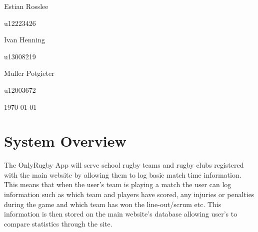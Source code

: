 \documentclass[hidelinks,a4paper,12pt]{article}
\begin{document}
\begin{titlepage}
\begin{center}
\begin{minipage}{0.4\textwidth}
\begin{flushleft} \large
Estian {Rosslee}
\end{flushleft}
\end{minipage}
\begin{minipage}{0.4\textwidth}
\begin{flushright} \large
\emph{}
u12223426
\end{flushright}
\end{minipage}

\begin{minipage}{0.4\textwidth}
\begin{flushleft} \large
Ivan {Henning}
\end{flushleft}
\end{minipage}
\begin{minipage}{0.4\textwidth}
\begin{flushright} \large
\emph{}
u13008219
\end{flushright}
\end{minipage}

\begin{minipage}{0.4\textwidth}
\begin{flushleft} \large
Muller {Potgieter}
\end{flushleft}
\end{minipage}
\begin{minipage}{0.4\textwidth}
\begin{flushright} \large
\emph{}
u12003672
\end{flushright}
\end{minipage}

\vfill
{\large \today}
\end{center}
\end{titlepage}
\footnotesize
%
\normalsize


\tableofcontents
\newpage
{}

\newpage
\section{System Overview} 
The OnlyRugby App will serve school rugby teams and rugby clubs registered with the main website by allowing them to log basic match time information. This means that when the user's team is playing a match the user can log information such as which team and players have scored, any injuries or penalties during the game and which team has won the line-out/scrum etc. This information is then stored on the main website's database allowing user's to compare statistics through the site.
\end{document}
